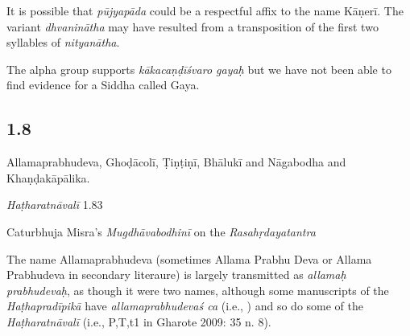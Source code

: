 \begin{ekdosis}
\begin{testimonia}[hp01_007]
\end{testimonia}

\begin{philcomm}[hp01_007]   
It is possible that \emph{pūjyapāda} could be a respectful affix to the name Kāṇerī. The variant \emph{dhvaninātha} may have resulted from a transposition of the first two syllables of \emph{nityanātha}.    

The alpha group supports \emph{kākacaṇḍīśvaro gayaḥ} but we have not been able to find evidence for a Siddha called Gaya.
\end{philcomm}

\subsection*{1.8}
\begin{translation}[hp01_008]
Allamaprabhudeva, Ghoḍācolī, Ṭiṇṭiṇī, Bhālukī and Nāgabodha and Khaṇḍakāpālika.
\end{translation}

\begin{testimonia}[hp01_008]
\emph{Haṭharatnāvalī} 1.83

\begin{versinnote}
\tl{\var{allamaḥ prabhudevaś ] allamaprabhudevaś P,T,t1}\\!}
\end{versinnote}

Caturbhuja Misra's \emph{Mugdhāvabodhinī} on the \emph{Rasahṛdayatantra}

\begin{versinnote}
\end{versinnote}

\end{testimonia}

\begin{philcomm}[hp01_008]  
The name Allamaprabhudeva (sometimes Allama Prabhu Deva or Allama Prabhudeva in secondary literaure) is largely transmitted as \emph{allamaḥ prabhu\-devaḥ}, as though it were two names, although some manuscripts of the \emph{Haṭha\-pradīpikā} have \emph{allamaprabhudevaś ca} (i.e., ) and so do some of the \emph{Haṭharatnāvalī} (i.e., P,T,t1 in Gharote 2009: 35 n. 8).


\end{philcomm}
\end{ekdosis}

